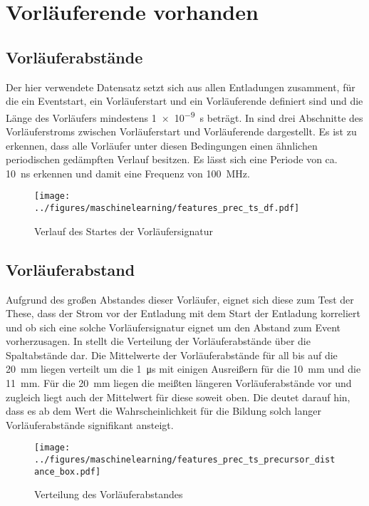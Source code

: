 \section{Vorläuferende vorhanden}
\subsection{Vorläuferabstände}
\label{sec:precursor}
Der hier verwendete Datensatz setzt sich aus allen Entladungen zusamment, für die ein Eventstart, ein Vorläuferstart und ein Vorläuferende definiert sind und die Länge des Vorläufers mindestens \SI{1e-9}{\s} beträgt. In  sind drei Abschnitte des Vorläuferstroms zwischen Vorläuferstart und Vorläuferende dargestellt. Es ist zu erkennen, dass alle Vorläufer unter diesen Bedingungen einen ähnlichen periodischen gedämpften Verlauf besitzen. Es lässt sich eine Periode von ca. \SI{10}{\nano\second} erkennen und damit eine Frequenz von \SI{100}{\mega\hertz}. 

\begin{figure}[htbp]
    \centering
      \texttt{[image: ../figures/maschinelearning/features\_prec\_ts\_df.pdf]}
      \caption{Verlauf des Startes der Vorläufersignatur}
      \label{fig:precursor_current_sliece}
\end{figure}

\subsection{Vorläuferabstand}
Aufgrund des großen Abstandes dieser Vorläufer, eignet sich diese zum Test der These, dass der Strom vor der Entladung mit dem Start der Entladung korreliert und ob sich eine solche Vorläufersignatur eignet um den Abstand zum Event vorherzusagen. In  stellt die Verteilung der Vorläuferabstände über die Spaltabstände dar. Die Mittelwerte der Vorläuferabstände für all bis auf die \SI{20}{\milli\meter} liegen verteilt um die \SI{1}{\micro\second} mit einigen Ausreißern für die \SI{10}{\milli\meter} und die \SI{11}{\milli\meter}. Für die \SI{20}{\milli\meter} liegen die meißten längeren Vorläuferabstände vor und zugleich liegt auch der Mittelwert für diese soweit oben. Die deutet darauf hin, dass es ab dem Wert die Wahrscheinlichkeit für die Bildung solch langer Vorläuferabstände signifikant ansteigt.

\begin{figure}[htbp]
    \centering
      \texttt{[image: ../figures/maschinelearning/features\_prec\_ts\_precursor\_distance\_box.pdf]}
      \caption{Verteilung des Vorläuferabstandes}
      \label{fig:prec_ts_prec_distance_box}
\end{figure}



